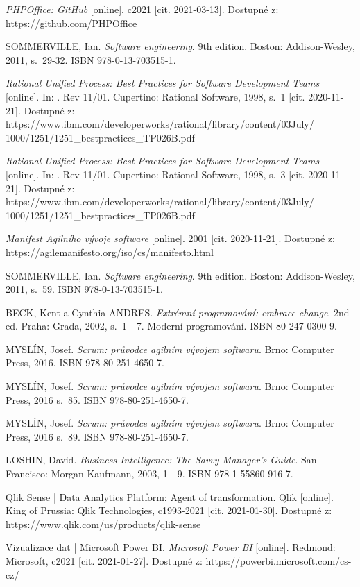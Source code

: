 \documentclass[czech,master]{diploma}
\begin{document}
\begin{thebibliography}{43}
\textit{PHPOffice: GitHub} [online]. c2021 [cit. 2021-03-13]. Dostupné z: https://github.com/PHPOffice



SOMMERVILLE, Ian. \textit{Software engineering}. 9th edition. Boston: Addison-Wesley, 2011, s.~29-32. ISBN 978-0-13-703515-1.

\textit{Rational Unified Process: Best Practices for Software Development Teams} [online]. In: . Rev 11/01. Cupertino: Rational Software, 1998, s.~1 [cit. 2020-11-21]. Dostupné z: https://www.ibm.com/developerworks/rational/library/content/03July/
1000/1251/1251\_bestpractices\_TP026B.pdf

\textit{Rational Unified Process: Best Practices for Software Development Teams} [online]. In: . Rev 11/01. Cupertino: Rational Software, 1998, s.~3 [cit. 2020-11-21]. Dostupné z: https://www.ibm.com/developerworks/rational/library/content/03July/
1000/1251/1251\_bestpractices\_TP026B.pdf

\textit{Manifest Agilního vývoje software} [online]. 2001 [cit. 2020-11-21]. Dostupné z: https://agilemanifesto.org/iso/cs/manifesto.html

SOMMERVILLE, Ian. \textit{Software engineering}. 9th edition. Boston: Addison-Wesley, 2011, s.~59. ISBN 978-0-13-703515-1.

BECK, Kent a Cynthia ANDRES. \textit{Extrémní programování: embrace change}. 2nd ed. Praha: Grada, 2002, s.~1---7. Moderní programování. ISBN 80-247-0300-9.

MYSLÍN, Josef. \textit{Scrum: průvodce agilním vývojem softwaru}. Brno: Computer Press, 2016. ISBN 978-80-251-4650-7.

MYSLÍN, Josef. \textit{Scrum: průvodce agilním vývojem softwaru}. Brno: Computer Press, 2016 s.~85. ISBN 978-80-251-4650-7.

MYSLÍN, Josef. \textit{Scrum: průvodce agilním vývojem softwaru}. Brno: Computer Press, 2016 s.~89. ISBN 978-80-251-4650-7.

LOSHIN, David. \textit{Business Intelligence: The Savvy Manager's Guide}. San Francisco: Morgan Kaufmann, 2003, 1 - 9. ISBN 978-1-55860-916-7.

Qlik Sense | Data Analytics Platform: Agent of transformation. Qlik [online]. King of Prussia: Qlik Technologies, c1993-2021 [cit. 2021-01-30]. Dostupné z: https://www.qlik.com/us/products/qlik-sense

Vizualizace dat | Microsoft Power BI. \textit{Microsoft Power BI} [online]. Redmond: Microsoft, c2021 [cit. 2021-01-27]. Dostupné z: https://powerbi.microsoft.com/cs-cz/

\end{thebibliography}
\end{document}
